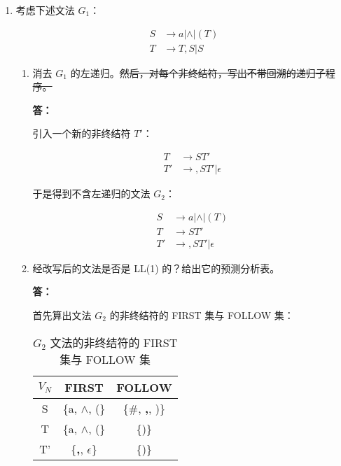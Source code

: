 \begin{enumerate}
    \item 考虑下述文法 $G_1$：
    
    \begin{align*}
        S & \to a | \wedge | (T) \\
        T & \to T,S | S
    \end{align*}
    
    \begin{enumerate}
        \item 消去 $G_1$ 的左递归。\sout{然后，对每个非终结符，写出不带回溯的递归子程序。}
        
        \textbf{答：}
        
        引入一个新的非终结符 $T'$：
        
        \begin{align*}
            T & \to ST' \\
            T' & \to ,ST' | \epsilon
        \end{align*}
        
        于是得到不含左递归的文法 $G_2$：
        
        \begin{align*}
            S & \to a | \wedge | (T) \\
            T & \to ST' \\
            T' & \to ,ST' | \epsilon
        \end{align*}
        
        \item 经改写后的文法是否是 LL(1) 的？给出它的预测分析表。
        
        \textbf{答：}
        
        首先算出文法 $G_2$ 的非终结符的 FIRST 集与 FOLLOW 集：
        
        \begin{table}[H]
            \centering
            \begin{tabular}{|c|c|c|}
                \hline
                $V_N$ & FIRST & FOLLOW \\
                \hline
                S & \{a, $\wedge$, (\} & \{\#, \textbf{,}, )\} \\
                \hline
                T & \{a, $\wedge$, (\} & \{)\} \\
                \hline
                T' & \{\textbf{,}, $\epsilon$\} & \{)\} \\
                \hline
            \end{tabular}
            \caption{$G_2$ 文法的非终结符的 FIRST 集与 FOLLOW 集}
            \label{tab:FF1}
        \end{table}
        

\end{enumerate}
\end{enumerate}
